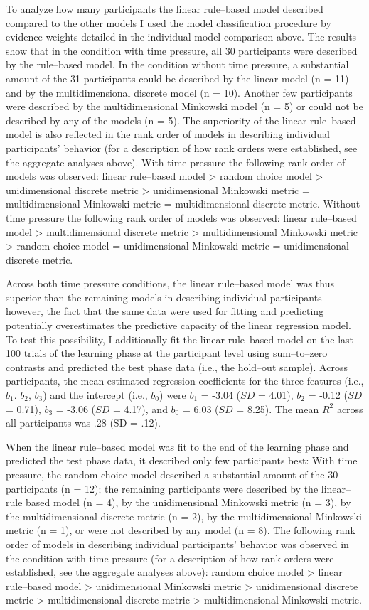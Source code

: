 \documentclass[a4paper,man,natbib]{apa6}
\begin{document}
To analyze how many participants the linear rule--based model described compared to the other models I used the model classification procedure by evidence weights detailed in the individual model comparison above. The results show that in the condition with time pressure, all 30 participants were described by the rule--based model. In the condition without time pressure, a substantial amount of the 31 participants could be described by the linear model (n = 11) and by the multidimensional discrete model (n = 10). Another few participants were described by the multidimensional Minkowski model (n = 5) or could not be described by any of the models (n = 5). 
The superiority of the linear rule--based model is also reflected in the rank order of models in describing individual participants' behavior (for a description of how rank orders were established, see the aggregate analyses above). With time pressure the following rank order of models was observed: linear rule--based model > random choice model > unidimensional discrete metric > unidimensional Minkowski metric = multidimensional Minkowski metric = multidimensional discrete metric. Without time pressure the following rank order of models was observed: linear rule--based model > multidimensional discrete metric > multidimensional Minkowski metric > random choice model = unidimensional Minkowski metric = unidimensional discrete metric.

Across both time pressure conditions, the linear rule--based model was thus superior than the remaining models in describing individual participants---however, the fact that the same data were used for fitting and predicting potentially overestimates the predictive capacity of the linear regression model. To test this possibility, I additionally fit the linear rule--based model on the last 100 trials of the learning phase at the participant level using sum--to--zero contrasts and predicted the test phase data (i.e., the hold--out sample). Across participants, the mean estimated regression coefficients for the three features (i.e., $b_1$. $b_2$, $b_3$) and the intercept (i.e., $b_0$) were $b_1$ = -3.04 ($SD$ = 4.01), $b_2$ = -0.12 ($SD$ = 0.71), $b_3$ = -3.06 ($SD$ = 4.17), and $b_0$ = 6.03 ($SD$ = 8.25). The mean $R^2$ across all participants was .28 (SD = .12). 

When the linear rule--based model was fit to the end of the learning phase and predicted the test phase data, it described only few participants best: With time pressure, the random choice model described a substantial amount of the 30 participants (n = 12); the remaining participants were described by the linear--rule based model (n = 4), by the unidimensional Minkowski metric (n = 3), by the multidimensional discrete metric (n = 2), by the multidimensional Minkowski metric (n = 1), or were not described by any model (n = 8). The following rank order of models in describing individual participants' behavior was observed in the condition with time pressure (for a description of how rank orders were established, see the aggregate analyses above): random choice model > linear rule--based model > unidimensional Minkowski metric > unidimensional discrete metric > multidimensional discrete metric > multidimensional Minkowski metric. 
\end{document}
